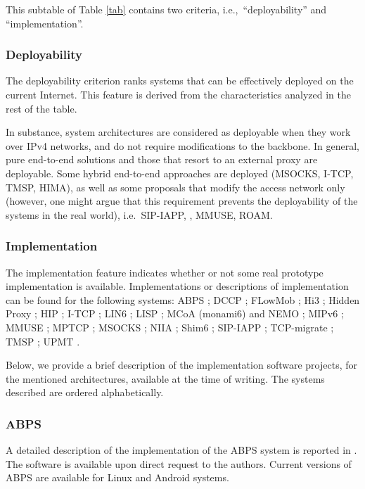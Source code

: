\documentclass[preprint,12pt]{elsarticle}
\begin{document}
This subtable of Table \ref{tab} 
contains two criteria, i.e.,~``deployability'' and 
``implementation''. 

\subsubsection{Deployability}
The deployability criterion ranks systems that can be effectively deployed on the 
current Internet. This feature is derived from the characteristics analyzed in 
the rest of the table.

In substance, system architectures are considered as deployable when they work over 
IPv4 networks, and do not require modifications to the backbone. In general, 
pure end-to-end solutions and those that resort to an external 
proxy are deployable. 
Some hybrid end-to-end approaches are deployed (MSOCKS, I-TCP, TMSP, HIMA), as 
well as some proposals that modify the access 
network only (however, one might argue that this requirement prevents the 
deployability of the systems in the real world), i.e.~SIP-IAPP, \cite{WuYH07}, 
MMUSE, ROAM.

\subsubsection{Implementation} 
The implementation feature indicates whether or not some real prototype 
implementation is available. Implementations or descriptions of implementation can 
be found for the following systems: 
ABPS \cite{GhiniJSS};
DCCP \cite{dccp_imp};
FLowMob \cite{MeliaBOGC11};
Hi3 \cite{hi3};
Hidden Proxy \cite{ghi06};
HIP \cite{LundbergJanne-ols2003,openhip_tech};
I-TCP \cite{itcp};
LIN6 \cite{draft-teraoka-ipng,kunishi2000lin6};
LISP \cite{openlisp,lispmob};
MCoA (monami6) and NEMO \cite{nemo1,umip,tahi};
MIPv6 \cite{Li:2009,nemo1,umip,tahi};
MMUSE \cite{mmuse_code};
MPTCP \cite{mptcp,Paasch:2012};
MSOCKS \cite{msocks};
NIIA \cite{Schutz20101142};
Shim6 \cite{Barre:2011,openhip_tech};
SIP-IAPP \cite{802f02};
TCP-migrate \cite{tcp-migrate};
TMSP \cite{LimYLL09};
UPMT \cite{Bonola:2009,upmtRoma}.

Below, we provide a brief description of the implementation software 
projects, for the mentioned architectures, available at the time of writing.
The systems described are ordered alphabetically.

\subsubsection*{ABPS} 
A detailed description of the implementation of the ABPS system is 
reported in \cite{GhiniJSS}. The software is available upon direct request to 
the authors. Current versions of ABPS are available for Linux and Android 
systems.
\end{document}
